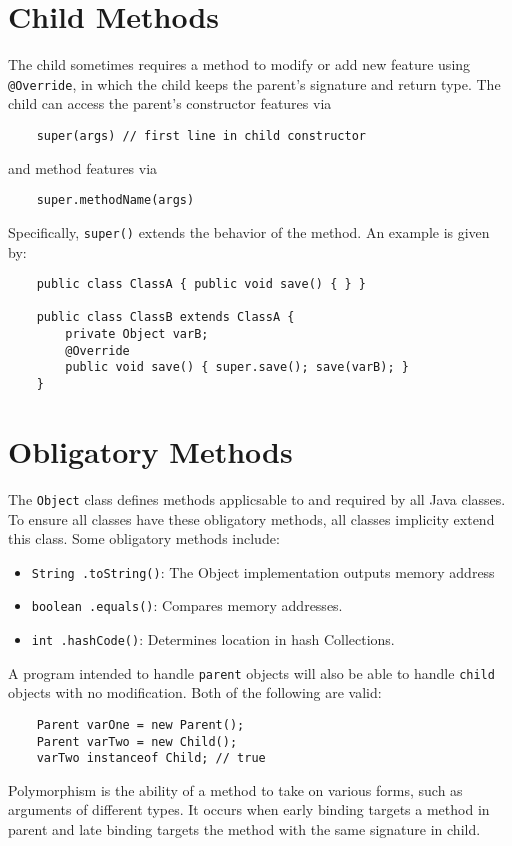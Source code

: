 \documentclass[letterpaper, openany, justified]{tufte-book}
\newcommand{\cd}[1]{\lstinline{#1}}
\begin{document}
\begin{fullwidth}
\section{Child Methods}
The child sometimes requires a method to modify or add new feature using \cd{@Override}, in which the child keeps the parent's signature and return type. The child can access the parent's constructor features via
\begin{lstlisting}
    super(args) // first line in child constructor
\end{lstlisting}
and method features via
\begin{lstlisting}
    super.methodName(args)
\end{lstlisting}
Specifically, \cd{super()} extends the behavior of the method. An example is given by:
\begin{lstlisting}
    public class ClassA { public void save() { } }

    public class ClassB extends ClassA {
        private Object varB;
        @Override
        public void save() { super.save(); save(varB); }
    }
\end{lstlisting}

\section{Obligatory Methods}
The \cd{Object} class defines methods applicsable to and required by all Java classes. To ensure all classes have these obligatory methods, all classes implicity extend this class. Some obligatory methods include:
\begin{itemize}
    \item \cd{String .toString()}: The Object implementation outputs memory address
    \item \cd{boolean .equals()}: Compares memory addresses.
    \item \cd{int .hashCode()}: Determines location in hash Collections.
\end{itemize}
A program intended to handle \cd{parent} objects will also be able to handle \cd{child} objects with no modification. Both of the following are valid:
\begin{lstlisting}
    Parent varOne = new Parent();
    Parent varTwo = new Child();
    varTwo instanceof Child; // true
\end{lstlisting}
Polymorphism is the ability of a method to take on various forms, such as arguments of different types. It occurs when early binding targets a method in parent and late binding targets the method with the same signature in child.


\end{fullwidth}
\end{document}

